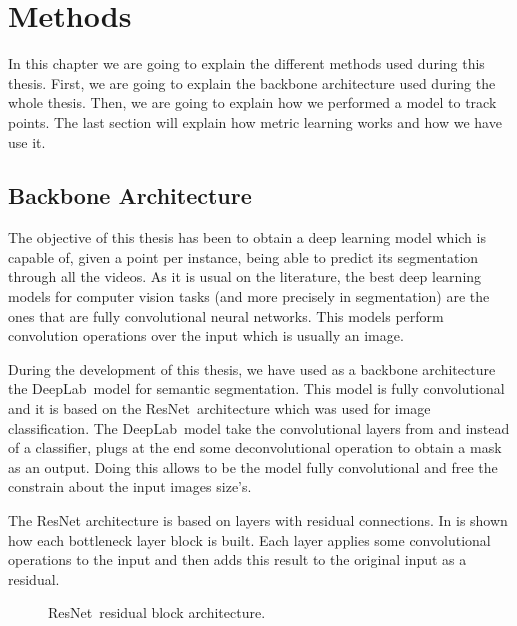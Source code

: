 
\chapter{Methods}
\label{cha:methods}

In this chapter we are going to explain the different methods used during this thesis.
First, we are going to explain the backbone architecture used during the whole thesis.
Then, we are going to explain how we performed a model to track points.
The last section will explain how metric learning works and how we have use it.

\section{Backbone Architecture}
\label{sec:methods_backbone_architecture}

The objective of this thesis has been to obtain a deep learning model which is capable of, given a point per instance, being able to predict its segmentation through all the videos.
As it is usual on the literature, the best deep learning models for computer vision tasks (and more precisely in segmentation) are the ones that are fully convolutional neural networks.
This models perform convolution operations over the input which is usually an image.

During the development of this thesis, we have used as a backbone architecture the DeepLab~\deeplab model for semantic segmentation.
This model is fully convolutional and it is based on the ResNet~\resnet architecture which was used for image classification.
The DeepLab~\deeplab model take the convolutional layers from and instead of a classifier, plugs at the end some deconvolutional operation to obtain a mask as an output.
Doing this allows to be the model fully convolutional and free the constrain about the input images size's.

The ResNet architecture is based on layers with residual connections.
In  is shown how each bottleneck layer block is built.
Each layer applies some convolutional operations to the input and then adds this result to the original input as a residual.

\begin{figure}[h]
  \centering
  \caption{ResNet~\resnet residual block architecture. }
  \label{fig:resnet_block}
\end{figure}

